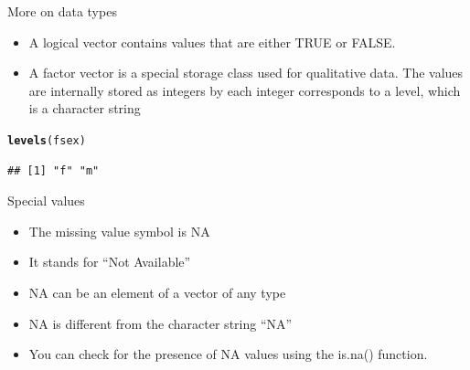 \documentclass{beamer}\usepackage[]{graphicx}\usepackage[]{color}
\makeatletter
\newcommand{\hlstd}[1]{\textcolor[rgb]{0.345,0.345,0.345}{#1}}%
\newcommand{\hlkwd}[1]{\textcolor[rgb]{0.737,0.353,0.396}{\textbf{#1}}}%
\newenvironment{kframe}{%
 \def\at@end@of@kframe{}%
 \ifinner\ifhmode%
  \def\at@end@of@kframe{\end{minipage}}%
  \begin{minipage}{\columnwidth}%
 \fi\fi%
 \def\FrameCommand##1{\hskip\@totalleftmargin \hskip-\fboxsep
 \colorbox{shadecolor}{##1}\hskip-\fboxsep
     \hskip-\linewidth \hskip-\@totalleftmargin \hskip\columnwidth}%
 \MakeFramed {\advance\hsize-\width
   \@totalleftmargin\z@ \linewidth\hsize
   \@setminipage}}%
 {\par\unskip\endMakeFramed%
 \at@end@of@kframe}
\newenvironment{knitrout}{}{} %
\renewenvironment{knitrout}{\begin{singlespace}}{\end{singlespace}}
\theoremstyle{mystyle}
\makeatother
\begin{document}
\begin{frame}[fragile]{More on data types}
\begin{itemize}
\item A logical vector contains values that are either TRUE or FALSE. 
\item A factor vector is a special storage class used for qualitative data. The values are internally stored as integers by each integer corresponds to a level, which is a character string
\end{itemize}
\begin{knitrout}
\color{fgcolor}\begin{kframe}
\begin{alltt}
\hlkwd{levels}\hlstd{(fsex)}
\end{alltt}
\begin{verbatim}
## [1] "f" "m"
\end{verbatim}
\end{kframe}
\end{knitrout}
\end{frame}

\begin{frame}[fragile]{Special values}
\begin{itemize}
\item The missing value symbol is NA  
\item It stands for “Not Available”
\item NA can be an element of a vector of any type  
\item NA is different from the character string “NA” 
\item You can check for the presence of NA values using the is.na() function.
\end{itemize}
\end{frame}
\end{document}
